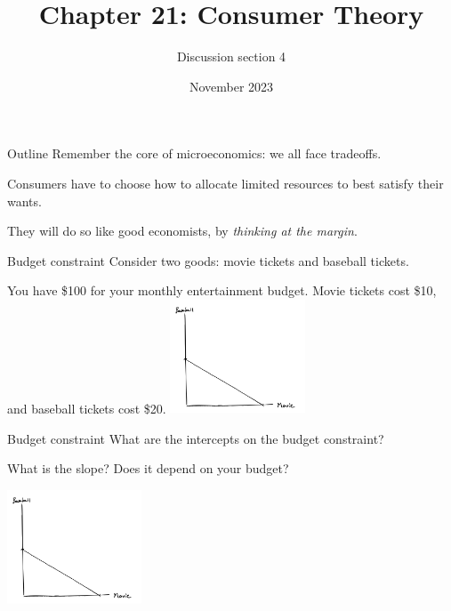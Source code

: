 \documentclass[aspectratio=169]{beamer}
\title{Chapter 21: Consumer Theory}
\author{Discussion section 4}
\date{November 2023}
\begin{document}
\begin{frame}
    \titlepage 
\end{frame}

\begin{frame}{Outline}
Remember the core of microeconomics: we all face tradeoffs.

\vspace{2mm}

Consumers have to choose how to allocate limited resources to best satisfy their wants.

\vspace{2mm}

They will do so like good economists, by \textit{thinking at the margin}. 
\end{frame}


\begin{frame}{Budget constraint}
    Consider two goods: movie tickets and baseball tickets.

    You have \$100 for your monthly entertainment budget. Movie tickets cost \$10, and baseball tickets cost \$20.
    \centering
        \includegraphics[width = 0.3\textwidth,keepaspectratio]{../figs/BC1.png}
\end{frame}

\begin{frame}{Budget constraint}
    What are the intercepts on the budget constraint?

    \vspace{2mm}

    What is the slope? Does it depend on your budget?

    \centering
        \includegraphics[width = 0.3\textwidth,keepaspectratio]{../figs/BC1.png}
\end{frame}
\end{document}
